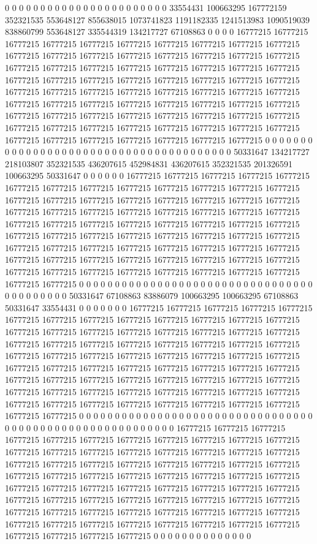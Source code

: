 0 0 0 0 0 0 0 0 0 0 0 0 0 0 0 0 0 0 0 0 0 0 0 33554431 100663295 167772159 352321535 553648127 855638015 1073741823 1191182335 1241513983 1090519039 838860799 553648127 335544319 134217727 67108863 0 0 0 0 16777215 16777215 16777215 16777215 16777215 16777215 16777215 16777215 16777215 16777215 16777215 16777215 16777215 16777215 16777215 16777215 16777215 16777215 16777215 16777215 16777215 16777215 16777215 16777215 16777215 16777215 16777215 16777215 16777215 16777215 16777215 16777215 16777215 16777215 16777215 16777215 16777215 16777215 16777215 16777215 16777215 16777215 16777215 16777215 16777215 16777215 16777215 16777215 16777215 16777215 16777215 16777215 16777215 16777215 16777215 16777215 16777215 16777215 16777215 16777215 16777215 16777215 16777215 16777215 16777215 16777215 16777215 16777215 16777215 16777215 16777215 16777215 16777215 0 0 0 0 0 0 0 0 0 0 0 0 0
0 0 0 0 0 0 0 0 0 0 0 0 0 0 0 0 0 0 0 0 0 0 0 0 0 0 50331647 134217727 218103807 352321535 436207615 452984831 436207615 352321535 201326591 100663295 50331647 0 0 0 0 0 0 16777215 16777215 16777215 16777215 16777215 16777215 16777215 16777215 16777215 16777215 16777215 16777215 16777215 16777215 16777215 16777215 16777215 16777215 16777215 16777215 16777215 16777215 16777215 16777215 16777215 16777215 16777215 16777215 16777215 16777215 16777215 16777215 16777215 16777215 16777215 16777215 16777215 16777215 16777215 16777215 16777215 16777215 16777215 16777215 16777215 16777215 16777215 16777215 16777215 16777215 16777215 16777215 16777215 16777215 16777215 16777215 16777215 16777215 16777215 16777215 16777215 16777215 16777215 16777215 16777215 16777215 16777215 16777215 16777215 16777215 16777215 0 0 0 0 0 0 0 0 0 0 0 0 0 0
0 0 0 0 0 0 0 0 0 0 0 0 0 0 0 0 0 0 0 0 0 0 0 0 0 0 0 0 50331647 67108863 83886079 100663295 100663295 67108863 50331647 33554431 0 0 0 0 0 0 0 16777215 16777215 16777215 16777215 16777215 16777215 16777215 16777215 16777215 16777215 16777215 16777215 16777215 16777215 16777215 16777215 16777215 16777215 16777215 16777215 16777215 16777215 16777215 16777215 16777215 16777215 16777215 16777215 16777215 16777215 16777215 16777215 16777215 16777215 16777215 16777215 16777215 16777215 16777215 16777215 16777215 16777215 16777215 16777215 16777215 16777215 16777215 16777215 16777215 16777215 16777215 16777215 16777215 16777215 16777215 16777215 16777215 16777215 16777215 16777215 16777215 16777215 16777215 16777215 16777215 16777215 16777215 16777215 16777215 16777215 16777215 0 0 0 0 0 0 0 0 0 0 0 0 0 0
0 0 0 0 0 0 0 0 0 0 0 0 0 0 0 0 0 0 0 0 0 0 0 0 0 0 0 0 0 0 0 0 0 0 0 0 0 0 0 0 0 0 0 16777215 16777215 16777215 16777215 16777215 16777215 16777215 16777215 16777215 16777215 16777215 16777215 16777215 16777215 16777215 16777215 16777215 16777215 16777215 16777215 16777215 16777215 16777215 16777215 16777215 16777215 16777215 16777215 16777215 16777215 16777215 16777215 16777215 16777215 16777215 16777215 16777215 16777215 16777215 16777215 16777215 16777215 16777215 16777215 16777215 16777215 16777215 16777215 16777215 16777215 16777215 16777215 16777215 16777215 16777215 16777215 16777215 16777215 16777215 16777215 16777215 16777215 16777215 16777215 16777215 16777215 16777215 16777215 16777215 16777215 16777215 0 0 0 0 0 0 0 0 0 0 0 0 0 0

